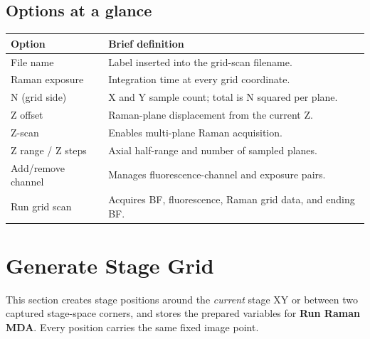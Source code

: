 \documentclass[11pt,oneside]{report}
\newcommand{\ui}[1]{\textbf{#1}}
\begin{document}
\section*{Options at a glance}
\begin{longtable}{@{}p{}p{}@{}}
\toprule\textbf{Option} & \textbf{Brief definition}\\\midrule
File name & Label inserted into the grid-scan filename.\\
Raman exposure & Integration time at every grid coordinate.\\
N (grid side) & X and Y sample count; total is N squared per plane.\\
Z offset & Raman-plane displacement from the current Z.\\
Z-scan & Enables multi-plane Raman acquisition.\\
Z range / Z steps & Axial half-range and number of sampled planes.\\
Add/remove channel & Manages fluorescence-channel and exposure pairs.\\
Run grid scan & Acquires BF, fluorescence, Raman grid data, and ending BF.\\
\bottomrule\end{longtable}

\chapter{Generate Stage Grid}

This section creates stage positions around the \emph{current} stage XY or
between two captured stage-space corners, and stores the prepared variables for
\ui{Run Raman MDA}.
Every position carries the same fixed image point.
\end{document}

